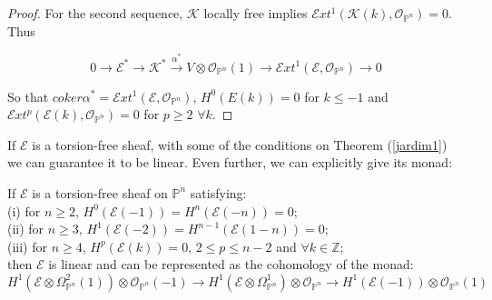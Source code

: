 \documentclass[
	oldfontcommands,
	sumario=abnt-6027-2012,
	12pt,			%
	openright,		%
	oneside,		%
	a4paper,		%
	english,		%
	brazil			%
	]{imecc-unicamp}
\begin{document}
\begin{proof}
For the second sequence, $\mathcal{K}$ locally free implies $\mathcal{E}xt^1(\mathcal{K}(k),\mathcal{O}_{\mathbb{P}^n})=0$. Thus

\begin{equation}
0 \to \mathcal{E}^* \to \mathcal{K}^* \overset{ \alpha^*}{\to} V \otimes \mathcal{O}_{\mathbb{P}^n}(1) \to \mathcal{E}xt^1(\mathcal{E},\mathcal{O}_{\mathbb{P}^n}) \to 0
\end{equation}

So that $coker \alpha^* = \mathcal{E}xt^1(\mathcal{E},\mathcal{O}_{\mathbb{P}^n})$, $H^0(E(k))=0$ for $k \leq -1$ and \\ $\mathcal{E}xt^p(\mathcal{E}(k),\mathcal{O}_{\mathbb{P}^n})=0$ for $p \geq 2$ $\forall k$.

\end{proof}

If $\mathcal{E}$ is a torsion-free sheaf, with some of the conditions on Theorem (\ref{jardim1}) we can guarantee it to be linear. Even further, we can explicitly give its monad:
\begin{theorem}\cite[Jardim]{jardim}
If $\mathcal{E}$ is a torsion-free sheaf on $\mathbb{P}^n$ satisfying: \\
(i) for $n \geq 2$, $H^0(\mathcal{E}(-1))=H^n(\mathcal{E}(-n))=0$; \\
(ii) for $n \geq 3$, $H^1(\mathcal{E}(-2))=H^{n-1}(\mathcal{E}(1-n))=0$; \\
(iii) for $n \geq 4$, $H^p(\mathcal{E}(k))=0$, $2 \leq p \leq n-2$ and $\forall k \in \mathbb{Z}$; \\
then $\mathcal{E}$ is linear and can be represented as the cohomology of the monad:
\begin{equation}
H^1(\mathcal{E} \otimes \Omega^{2}_{\mathbb{P}^n}(1)) \otimes \mathcal{O}_{\mathbb{P}^n}(-1) \to H^1(\mathcal{E} \otimes \Omega^{1}_{\mathbb{P}^n}) \otimes \mathcal{O}_{\mathbb{P}^n} \to H^1(\mathcal{E}(-1)) \otimes \mathcal{O}_{\mathbb{P}^n}(1)
\end{equation}
\end{theorem}
\end{document}
